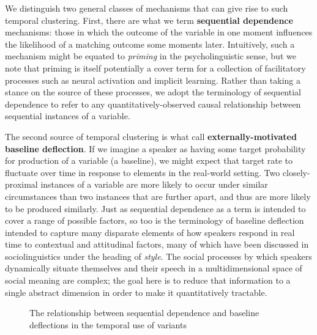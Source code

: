 \documentclass[12pt]{article}
\begin{document}
We  distinguish two general classes of mechanisms that can give rise to such temporal clustering. First, there are what we term \textbf{sequential dependence} mechanisms: those in which the outcome of the variable in one moment influences the likelihood of a matching outcome some moments later. Intuitively, such a mechanism might be equated to \emph{priming} in the psycholinguistic sense, but we note that priming is itself potentially a cover term for a collection of facilitatory processes such as neural activation and implicit learning. Rather than taking a stance on the source of these processes, we adopt the terminology of sequential dependence to refer to any quantitatively-observed causal relationship between sequential instances of a variable.
    
The second source of temporal clustering is what \citet{Tamminga:2016a} call \textbf{externally-motivated baseline deflection}. If we imagine a speaker as having some target probability for production of a variable (a baseline), we might expect that target rate to fluctuate over time in response to elements in the real-world setting. Two closely-proximal instances of a variable are more likely to occur under similar circumstances than two instances that are further apart, and thus are more likely to be produced similarly. Just as sequential dependence as a term is intended to cover a range of possible factors, so too is the terminology of baseline deflection intended to capture many disparate elements of how speakers respond in real time to contextual and attitudinal factors, many of which have been discussed in sociolinguistics under the heading of \emph{style}. The social processes by which speakers dynamically situate themselves and their speech in a multidimensional space of social meaning are complex; the goal here is to reduce that information to a single abstract dimension in order to make it quantitatively tractable.


\begin{figure}
\begin{center}
    \end{center}
\caption{The relationship between sequential dependence and baseline deflections in the temporal use of variants}
\label{confounding}
\end{figure}
\end{document}
